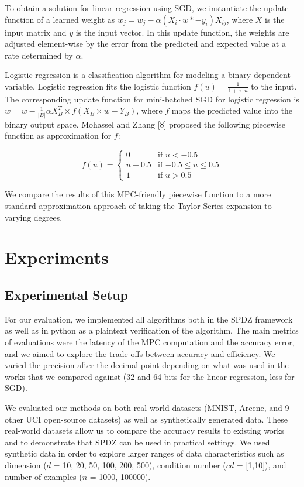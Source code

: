 \documentclass{article}
\begin{document}
To obtain a solution for linear regression using SGD, we instantiate the update function of a learned weight as $w_j = w_j  - \alpha(X_i \cdot w *-y_i)X_{ij}$, where $X$ is the input matrix and $y$ is the input vector. In this update function, the weights are adjusted element-wise by the error from the predicted and expected value at a rate determined by $\alpha$.

Logistic regression is a classification algorithm for modeling a binary dependent variable. Logistic regression fits the logistic function $f(u) = \frac{1}{1+e^-u}$ to the input. The corresponding update function for mini-batched SGD for logistic regression is $w = w - \frac{1}{|B|} \alpha X^{T}_{B} \times f(X_{B} \times w - Y_{B})$, where $f$ maps the predicted value into the binary output space. Mohassel and Zhang [8] proposed the following piecewise function as approximation for $f$:

\[
  f(u) =
  \begin{cases}
                                   0 & \text{if $u < -0.5$} \\
                                   u + 0.5 & \text{if $-0.5 \leq u \leq 0.5$} \\
1 & \text{if $u > 0.5$}
  \end{cases}
\]

We compare the results of this MPC-friendly piecewise function to a more standard approximation approach of taking the Taylor Series expansion to varying degrees.

\section{Experiments}

\subsection{Experimental Setup}

For our evaluation, we implemented all algorithms both in the SPDZ framework as well as in python as a plaintext verification of the algorithm.
The main metrics of evaluations were the latency of the MPC computation and the accuracy error, and we aimed to explore the trade-offs between accuracy and efficiency. We varied the precision after the decimal point 
depending on what was used in the works that we compared against (32 and 64 bits for the linear regression, less for SGD).

We evaluated our methods on both real-world datasets (MNIST, Arcene, and 9 other UCI open-source datasets) as well as synthetically generated data. These real-world datasets allow us to compare the accuracy results to existing works and to demonstrate that SPDZ can be used in practical settings. We used synthetic data in order to explore larger ranges of data characteristics such as dimension ($d$ = 10, 20, 50, 100, 200, 500), condition number ($cd$ = [1,10]), and number of examples ($n$ = 1000, 100000).
\end{document}
